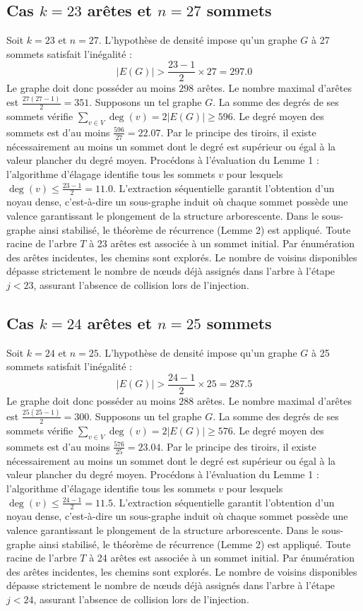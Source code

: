 \documentclass[12pt,a4paper]{article}
\begin{document}
\subsection{Cas $k = 23$ arêtes et $n = 27$ sommets}
Soit $k = 23$ et $n = 27$. L'hypothèse de densité impose qu'un graphe $G$ à 27 sommets satisfait l'inégalité :
$$ |E(G)| > \frac{23-1}{2} \times 27 = 297.0 $$
Le graphe doit donc posséder au moins $298$ arêtes. Le nombre maximal d'arêtes est $\frac{27(27-1)}{2} = 351$.
Supposons un tel graphe $G$. La somme des degrés de ses sommets vérifie $\sum_{v \in V} \deg(v) = 2|E(G)| \geq 596$.
Le degré moyen des sommets est d'au moins $\frac{596}{27} = 22.07$.
Par le principe des tiroirs, il existe nécessairement au moins un sommet dont le degré est supérieur ou égal à la valeur plancher du degré moyen.
Procédons à l'évaluation du Lemme 1 : l'algorithme d'élagage identifie tous les sommets $v$ pour lesquels $\deg(v) \leq \frac{23-1}{2} = 11.0$.
L'extraction séquentielle garantit l'obtention d'un noyau dense, c'est-à-dire un sous-graphe induit où chaque sommet possède une valence garantissant le plongement de la structure arborescente.
Dans le sous-graphe ainsi stabilisé, le théorème de récurrence (Lemme 2) est appliqué. Toute racine de l'arbre $T$ à 23 arêtes est associée à un sommet initial. Par énumération des arêtes incidentes, les chemins sont explorés. Le nombre de voisins disponibles dépasse strictement le nombre de nœuds déjà assignés dans l'arbre à l'étape $j < 23$, assurant l'absence de collision lors de l'injection.

\subsection{Cas $k = 24$ arêtes et $n = 25$ sommets}
Soit $k = 24$ et $n = 25$. L'hypothèse de densité impose qu'un graphe $G$ à 25 sommets satisfait l'inégalité :
$$ |E(G)| > \frac{24-1}{2} \times 25 = 287.5 $$
Le graphe doit donc posséder au moins $288$ arêtes. Le nombre maximal d'arêtes est $\frac{25(25-1)}{2} = 300$.
Supposons un tel graphe $G$. La somme des degrés de ses sommets vérifie $\sum_{v \in V} \deg(v) = 2|E(G)| \geq 576$.
Le degré moyen des sommets est d'au moins $\frac{576}{25} = 23.04$.
Par le principe des tiroirs, il existe nécessairement au moins un sommet dont le degré est supérieur ou égal à la valeur plancher du degré moyen.
Procédons à l'évaluation du Lemme 1 : l'algorithme d'élagage identifie tous les sommets $v$ pour lesquels $\deg(v) \leq \frac{24-1}{2} = 11.5$.
L'extraction séquentielle garantit l'obtention d'un noyau dense, c'est-à-dire un sous-graphe induit où chaque sommet possède une valence garantissant le plongement de la structure arborescente.
Dans le sous-graphe ainsi stabilisé, le théorème de récurrence (Lemme 2) est appliqué. Toute racine de l'arbre $T$ à 24 arêtes est associée à un sommet initial. Par énumération des arêtes incidentes, les chemins sont explorés. Le nombre de voisins disponibles dépasse strictement le nombre de nœuds déjà assignés dans l'arbre à l'étape $j < 24$, assurant l'absence de collision lors de l'injection.
\end{document}
